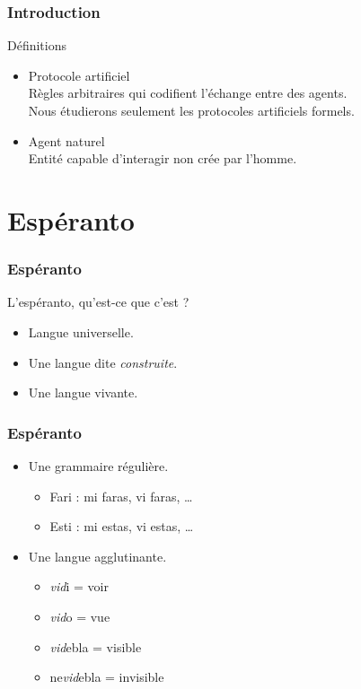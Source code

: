 \documentclass{beamer}
\begin{document}
\begin{frame}
\frametitle{Introduction}
\begin{block}{Définitions}
\begin{itemize}
	\item Protocole artificiel\\
	Règles arbitraires qui codifient l'échange entre des agents.\\
	Nous étudierons seulement les protocoles artificiels formels.
	\item Agent naturel\\
	Entité capable d'interagir non crée par l'homme.
\end{itemize}
\end{block}
\end{frame}

\section{Espéranto}

\begin{frame}
\frametitle{Espéranto}
\begin{block}{L'espéranto, qu'est-ce que c'est ?}
\begin{itemize}
\item Langue universelle.
\item Une langue dite \emph{construite}.
\item Une langue vivante.
\end{itemize}
\end{block}
\end{frame}

\begin{frame}
\frametitle{Espéranto}
\begin{itemize}
\item Une grammaire régulière.
\begin{itemize}
\item Fari : mi faras, vi faras, \dots
\item Esti : mi estas, vi estas, \dots
\end{itemize}
\item Une langue agglutinante.
\begin{itemize}
\item {\color{brown}\emph{vid}}i = voir
\item {\color{brown}\emph{vid}}o = vue
\item {\color{brown}\emph{vid}}ebla = visible
\item ne{\color{brown}\emph{vid}}ebla = invisible
\end{itemize}
\end{itemize}
\end{frame}
\end{document}
